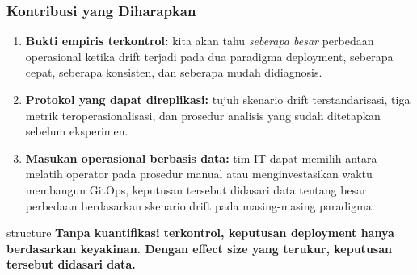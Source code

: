 {
\usebackgroundtemplate{\backgroundcontent}
\begin{frame}
    \frametitle{Kontribusi yang Diharapkan}
    \vspace{0.10cm}
    \begin{enumerate}\setlength{\itemsep}{6pt}
        \item \textbf{Bukti empiris terkontrol:} kita akan tahu \textit{seberapa besar} perbedaan operasional ketika drift terjadi pada dua paradigma deployment, seberapa cepat, seberapa konsisten, dan seberapa mudah didiagnosis.
        \item \textbf{Protokol yang dapat direplikasi:} tujuh skenario drift terstandarisasi, tiga metrik teroperasionalisasi, dan prosedur analisis yang sudah ditetapkan sebelum eksperimen.
        \item \textbf{Masukan operasional berbasis data:} tim IT dapat memilih antara melatih operator pada prosedur manual atau menginvestasikan waktu membangun GitOps, keputusan tersebut didasari data tentang besar perbedaan berdasarkan skenario drift pada masing-masing paradigma.
    \end{enumerate}
    \vspace{0.20cm}
    \centering
    \begin{beamercolorbox}[wd=0.88\textwidth, sep=0.20cm, center, rounded=true]{structure}
        \normalsize\bfseries Tanpa kuantifikasi terkontrol, keputusan deployment hanya berdasarkan keyakinan. Dengan effect size yang terukur, keputusan tersebut didasari data.
    \end{beamercolorbox}
\end{frame}
}

\appendix

